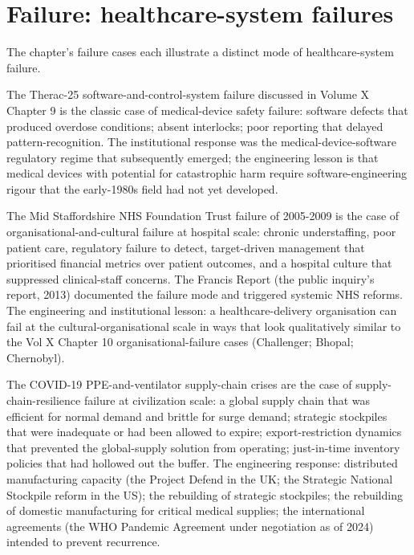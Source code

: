\section{Failure: healthcare-system failures}

The chapter's failure cases each illustrate a distinct mode of healthcare-system failure.

The Therac-25 software-and-control-system failure \cite{paper:leveson-turner1993} discussed in Volume X Chapter 9 is the classic case of medical-device safety failure: software defects that produced overdose conditions; absent interlocks; poor reporting that delayed pattern-recognition. The institutional response was the medical-device-software regulatory regime that subsequently emerged; the engineering lesson is that medical devices with potential for catastrophic harm require software-engineering rigour that the early-1980s field had not yet developed.

The Mid Staffordshire NHS Foundation Trust failure of 2005-2009 \cite{acc:francis-mid-staffs-2013} is the case of organisational-and-cultural failure at hospital scale: chronic understaffing, poor patient care, regulatory failure to detect, target-driven management that prioritised financial metrics over patient outcomes, and a hospital culture that suppressed clinical-staff concerns. The Francis Report (the public inquiry's report, 2013) documented the failure mode and triggered systemic NHS reforms. The engineering and institutional lesson: a healthcare-delivery organisation can fail at the cultural-organisational scale in ways that look qualitatively similar to the Vol X Chapter 10 organisational-failure cases (Challenger; Bhopal; Chernobyl).

The COVID-19 PPE-and-ventilator supply-chain crises \cite{paper:cohen-pandemic-supply-2020} are the case of supply-chain-resilience failure at civilization scale: a global supply chain that was efficient for normal demand and brittle for surge demand; strategic stockpiles that were inadequate or had been allowed to expire; export-restriction dynamics that prevented the global-supply solution from operating; just-in-time inventory policies that had hollowed out the buffer. The engineering response: distributed manufacturing capacity (the Project Defend in the UK; the Strategic National Stockpile reform in the US); the rebuilding of strategic stockpiles; the rebuilding of domestic manufacturing for critical medical supplies; the international agreements (the WHO Pandemic Agreement under negotiation as of 2024) intended to prevent recurrence.

